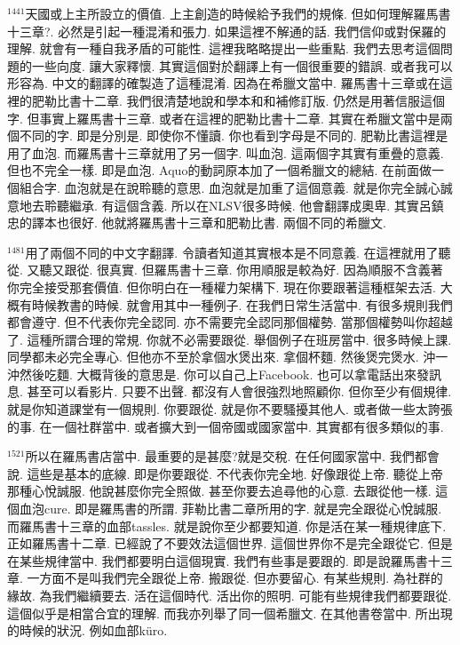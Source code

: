 \documentclass{book}
\begin{document}
$^{1441}$天國或上主所設立的價值.
上主創造的時候給予我們的規條.
但如何理解羅馬書十三章?.
必然是引起一種混淆和張力.
如果這裡不解通的話.
我們信仰或對保羅的理解.
就會有一種自我矛盾的可能性.
這裡我略略提出一些重點.
我們去思考這個問題的一些向度.
讓大家釋懷.
其實這個對於翻譯上有一個很重要的錯誤.
或者我可以形容為.
中文的翻譯的確製造了這種混淆.
因為在希臘文當中.
羅馬書十三章或在這裡的肥勒比書十二章.
我們很清楚地說和學本和和補修訂版.
仍然是用著信服這個字.
但事實上羅馬書十三章.
或者在這裡的肥勒比書十二章.
其實在希臘文當中是兩個不同的字.
即是分別是.
即使你不懂讀.
你也看到字母是不同的.
肥勒比書這裡是用了血泡.
而羅馬書十三章就用了另一個字.
叫血泡.
這兩個字其實有重疊的意義.
但也不完全一樣.
即是血泡.
Aquo的動詞原本加了一個希臘文的總結.
在前面做一個組合字.
血泡就是在說聆聽的意思.
血泡就是加重了這個意義.
就是你完全誠心誠意地去聆聽繼承.
有這個含義.
所以在NLSV很多時候.
他會翻譯成奧卑.
其實呂鎮忠的譯本也很好.
他就將羅馬書十三章和肥勒比書.
兩個不同的希臘文.

$^{1481}$用了兩個不同的中文字翻譯.
令讀者知道其實根本是不同意義.
在這裡就用了聽從.
又聽又跟從.
很真實.
但羅馬書十三章.
你用順服是較為好.
因為順服不含義著你完全接受那套價值.
但你明白在一種權力架構下.
現在你要跟著這種框架去活.
大概有時候教書的時候.
就會用其中一種例子.
在我們日常生活當中.
有很多規則我們都會遵守.
但不代表你完全認同.
亦不需要完全認同那個權勢.
當那個權勢叫你超越了.
這種所謂合理的常規.
你就不必需要跟從.
舉個例子在班房當中.
很多時候上課.
同學都未必完全專心.
但他亦不至於拿個水煲出來.
拿個杯麵.
然後煲完煲水.
沖一沖然後吃麵.
大概背後的意思是.
你可以自己上Facebook.
也可以拿電話出來發訊息.
甚至可以看影片.
只要不出聲.
都沒有人會很強烈地照顧你.
但你至少有個規律.
就是你知道課堂有一個規則.
你要跟從.
就是你不要騷擾其他人.
或者做一些太誇張的事.
在一個社群當中.
或者擴大到一個帝國或國家當中.
其實都有很多類似的事.

$^{1521}$所以在羅馬書店當中.
最重要的是甚麼?就是交稅.
在任何國家當中.
我們都會說.
這些是基本的底線.
即是你要跟從.
不代表你完全地.
好像跟從上帝.
聽從上帝那種心悅誠服.
他說甚麼你完全照做.
甚至你要去追尋他的心意.
去跟從他一樣.
這個血泡cure.
即是羅馬書的所謂.
菲勒比書二章所用的字.
就是完全跟從心悅誠服.
而羅馬書十三章的血部tassles.
就是說你至少都要知道.
你是活在某一種規律底下.
正如羅馬書十二章.
已經說了不要效法這個世界.
這個世界你不是完全跟從它.
但是在某些規律當中.
我們都要明白這個現實.
我們有些事是要跟的.
即是說羅馬書十三章.
一方面不是叫我們完全跟從上帝.
搬跟從.
但亦要留心.
有某些規則.
為社群的緣故.
為我們繼續要去.
活在這個時代.
活出你的照明.
可能有些規律我們都要跟從.
這個似乎是相當合宜的理解.
而我亦列舉了同一個希臘文.
在其他書卷當中.
所出現的時候的狀況.
例如血部küro.
\end{document}
